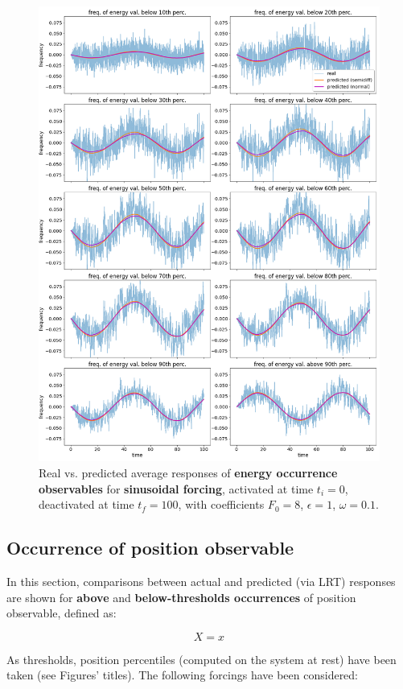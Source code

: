 \documentclass{article}
\begin{document}
\begin{figure}[!h]
	\centering
	\includegraphics[height=1\linewidth]{fig/pred_energy_below_SinF_8_10_01_0_100.png}
	\caption{Real vs. predicted average responses of \textbf{energy occurrence observables} for \textbf{sinusoidal forcing}, activated at time $t_i=0$, deactivated at time $t_f=100$, with coefficients $F_0 = 8$, $\epsilon = 1$, $\omega = 0.1$.}
	\label{fig:pred_energy_below_SinF_8_10_01_0_100}
\end{figure}

\clearpage

\subsection{Occurrence of position observable}

In this section, comparisons between actual and predicted (via LRT) responses are shown for \textbf{above} and \textbf{below-thresholds occurrences} of position observable, defined as:

\begin{equation}
X = x
\end{equation}

As thresholds, position percentiles (computed on the system at rest) have been taken (see Figures' titles).
The following forcings have been considered:
\end{document}
